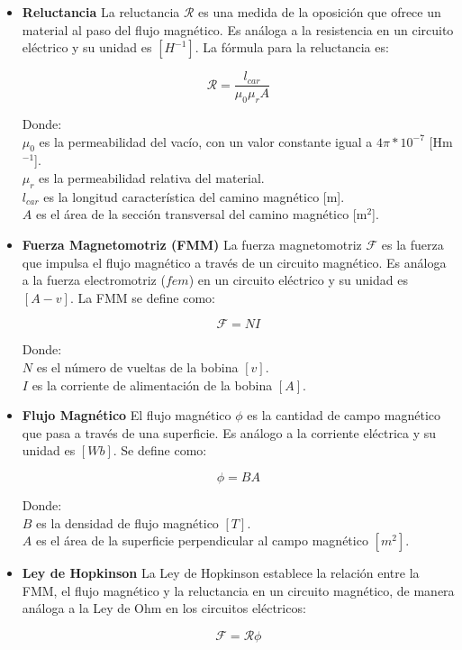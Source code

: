 \begin{itemize}
    \item \textbf{Reluctancia}
    La reluctancia \(\mathcal{R}\) es una medida de la oposición que ofrece un material al paso del flujo magnético. Es análoga a la resistencia en un circuito eléctrico y su unidad es \([H^{-1}]\). La fórmula para la reluctancia es:
    
    \[\mathcal{R}=\frac{l_{car}}{\mu_0\mu_r A}\] 
    
    Donde:\\
    \(\mu_0\) es la permeabilidad del vacío, con un valor constante igual a \(4\pi*10^{-7}\) [Hm\(^{-1}\)].\\
    \(\mu_r\) es la permeabilidad relativa del material.\\
    \(l_{car}\) es la longitud característica del camino magnético [m].\\
    \(A\) es el área de la sección transversal del camino magnético [m\(^2\)].\\

    \item \textbf{Fuerza Magnetomotriz (FMM)}
    La fuerza magnetomotriz \(\mathcal{F}\) es la fuerza que impulsa el flujo magnético a través de un circuito magnético. Es análoga a la fuerza electromotriz (\(fem\)) en un circuito eléctrico y su unidad es \([A-v]\). La FMM se define como:
    
    \[\mathcal{F}=NI\]
    
    Donde:\\
    \(N\) es el número de vueltas de la bobina \([v]\).\\
    \(I\) es la corriente de alimentación de la bobina \([A]\).\\

    \item \textbf{Flujo Magnético}
    El flujo magnético \(\phi\) es la cantidad de campo magnético que pasa a través de una superficie. Es análogo a la corriente eléctrica y su unidad es \([Wb]\). Se define como:
    
    \[\phi = BA\]
    
    Donde:\\
    \(B\) es la densidad de flujo magnético \([T]\).\\
    \(A\) es el área de la superficie perpendicular al campo magnético \([m^2]\).\\

    \item \textbf{Ley de Hopkinson}
    La Ley de Hopkinson establece la relación entre la FMM, el flujo magnético y la reluctancia en un circuito magnético, de manera análoga a la Ley de Ohm en los circuitos eléctricos:
    
    \[\mathcal{F}=\mathcal{R}\phi\]
\end{itemize}

